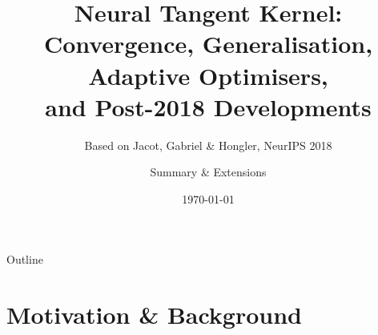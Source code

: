 \documentclass[aspectratio=169, 10pt]{beamer}
\title[NTK, Natural Gradient, SR, Adam \& Beyond]{%
  Neural Tangent Kernel:\\
  Convergence, Generalisation, Adaptive Optimisers,\\
  and Post-2018 Developments}
\subtitle{Based on Jacot, Gabriel \& Hongler, NeurIPS 2018}
\author{Summary \& Extensions}
\date{\today}
\begin{document}

\begin{frame}
  \titlepage
\end{frame}

\begin{frame}{Outline}
  \tableofcontents
\end{frame}

\section{Motivation \& Background}
\end{document}
